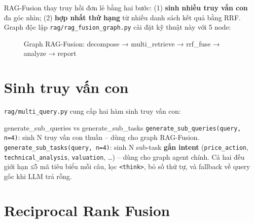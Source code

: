 \documentclass[12pt, a4paper]{report}
\begin{document}
RAG-Fusion thay truy hồi đơn lẻ bằng hai bước: (1) \textbf{sinh nhiều truy vấn con} đa góc nhìn; (2) \textbf{hợp nhất thứ hạng} từ nhiều danh sách kết quả bằng RRF. Graph độc lập \texttt{rag/rag\_fusion\_graph.py} cài đặt kỹ thuật này với 5 node:

\begin{figure}[H]
\centering
{}
\caption{Graph RAG-Fusion: decompose → multi\_retrieve → rrf\_fuse → analyze → report}
\label{fig:ragfusion}
\end{figure}

\section{Sinh truy vấn con}

\texttt{rag/multi\_query.py} cung cấp hai hàm sinh truy vấn con:

\begin{keybox}{generate\_sub\_queries vs generate\_sub\_tasks}
\texttt{generate\_sub\_queries(query, n=4)}: sinh N truy vấn con thuần -- dùng cho graph RAG-Fusion.\\
\texttt{generate\_sub\_tasks(query, n=4)}: sinh N sub-task \textbf{gắn intent} (\texttt{price\_action}, \texttt{technical\_analysis}, \texttt{valuation}, \ldots) -- dùng cho graph agent chính. Cả hai đều giới hạn ≤5 mã tiêu biểu mỗi câu, lọc \texttt{<think>}, bỏ số thứ tự, và fallback về query gốc khi LLM trả rỗng.
\end{keybox}

\section{Reciprocal Rank Fusion}
\end{document}
